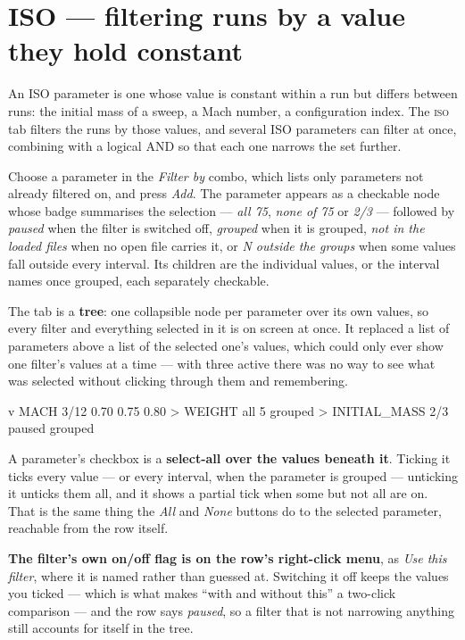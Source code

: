 \documentclass[11pt,a4paper,oneside]{report}
\newcommand{\tab}[1]{\textsc{#1}}
\begin{document}
\section{ISO --- filtering runs by a value they hold constant}
\label{sec:iso}

An ISO parameter is one whose value is constant within a run but differs between
runs: the initial mass of a sweep, a Mach number, a configuration index. The
\tab{iso} tab filters the runs by those values, and several ISO parameters can
filter at once, combining with a logical AND so that each one narrows the set
further.

Choose a parameter in the \emph{Filter by} combo, which lists only parameters not
already filtered on, and press \emph{Add}. The parameter appears as a checkable
node whose badge summarises the selection --- \emph{all 75}, \emph{none of 75} or
\emph{2/3} --- followed by \emph{paused} when the filter is switched off,
\emph{grouped} when it is grouped, \emph{not in the loaded files} when no open
file carries it, or \emph{N outside the groups} when some values fall outside
every interval. Its children are the individual values, or the interval names
once grouped, each separately checkable.

The tab is a \textbf{tree}: one collapsible node per parameter over its own
values, so every filter and everything selected in it is on screen at once. It
replaced a list of parameters above a list of the selected one's values, which
could only ever show one filter's values at a time --- with three active there
was no way to see what was selected without clicking through them and
remembering.

\begin{aoecode}
 v MACH      3/12
     0.70
     0.75
     0.80
 > WEIGHT    all 5   grouped
 > INITIAL_MASS   2/3   paused   grouped
\end{aoecode}

A parameter's checkbox is a \textbf{select-all over the values beneath it}.
Ticking it ticks every value --- or every interval, when the parameter is
grouped --- unticking it unticks them all, and it shows a partial tick when some
but not all are on. That is the same thing the \emph{All} and \emph{None}
buttons do to the selected parameter, reachable from the row itself.

\textbf{The filter's own on/off flag is on the row's right-click menu}, as
\emph{Use this filter}, where it is named rather than guessed at. Switching it
off keeps the values you ticked --- which is what makes ``with and without
this'' a two-click comparison --- and the row says \emph{paused}, so a filter
that is not narrowing anything still accounts for itself in the tree.
\end{document}

